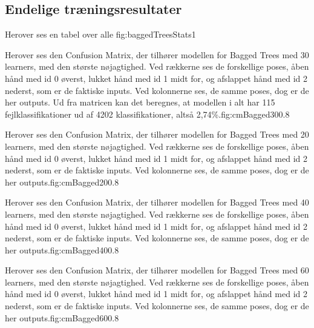 \section{Endelige træningsresultater}

{Herover ses en tabel over alle }{fig:baggedTreesStats}{1}

{Herover ses den Confusion Matrix, der tilhører modellen for Bagged Trees med 30 learners, med den største nøjagtighed. Ved rækkerne ses de forskellige poses, åben hånd med id 0 øverst, lukket hånd med id 1 midt for, og afslappet hånd med id 2 nederst, som er de faktiske inputs. Ved kolonnerne ses, de samme poses, dog er de her outputs. Ud fra matricen kan det beregnes, at modellen i alt har 115 fejlklassifikationer ud af 4202 klassifikationer, altså 2,74\%.}{fig:cmBagged30}{0.8}

{Herover ses den Confusion Matrix, der tilhører modellen for Bagged Trees med 20 learners, med den største nøjagtighed. Ved rækkerne ses de forskellige poses, åben hånd med id 0 øverst, lukket hånd med id 1 midt for, og afslappet hånd med id 2 nederst, som er de faktiske inputs. Ved kolonnerne ses, de samme poses, dog er de her outputs.}{fig:cmBagged20}{0.8}

{Herover ses den Confusion Matrix, der tilhører modellen for Bagged Trees med 40 learners, med den største nøjagtighed. Ved rækkerne ses de forskellige poses, åben hånd med id 0 øverst, lukket hånd med id 1 midt for, og afslappet hånd med id 2 nederst, som er de faktiske inputs. Ved kolonnerne ses, de samme poses, dog er de her outputs.}{fig:cmBagged40}{0.8}

{Herover ses den Confusion Matrix, der tilhører modellen for Bagged Trees med 60 learners, med den største nøjagtighed. Ved rækkerne ses de forskellige poses, åben hånd med id 0 øverst, lukket hånd med id 1 midt for, og afslappet hånd med id 2 nederst, som er de faktiske inputs. Ved kolonnerne ses, de samme poses, dog er de her outputs.}{fig:cmBagged60}{0.8}
\chapter{}
\newpage
\listoftables
\vspace{1cm}
\listoffigures